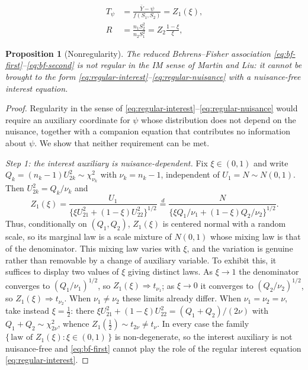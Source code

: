 \documentclass[10pt,a4paper]{amsart}
\newtheorem{proposition}{Proposition}
\begin{document}
\begin{align}
T_\psi
&=
\frac{\bar Y-\psi}{f(S_1,S_2)}
=
Z_1(\xi), \label{eq:bf-first}\\
R
&=
\frac{n_1S_2^2}{n_2S_1^2}
=
Z_2\frac{1-\xi}{\xi}, \label{eq:bf-second}
\end{align}

\begin{proposition}[Nonregularity]
\label{prop:nonregular}
The reduced Behrens--Fisher association \eqref{eq:bf-first}--\eqref{eq:bf-second}
is not regular in the IM sense of Martin and Liu: it cannot be brought to the
form \eqref{eq:regular-interest}--\eqref{eq:regular-nuisance} with a
nuisance-free interest equation.
\end{proposition}

\begin{proof}
Regularity in the sense of
\eqref{eq:regular-interest}--\eqref{eq:regular-nuisance} would require an
auxiliary coordinate for \(\psi\) whose distribution does not depend on the
nuisance, together with a companion equation that contributes no information
about \(\psi\).  We show that neither requirement can be met.

\emph{Step 1: the interest auxiliary is nuisance-dependent.}
Fix \(\xi\in(0,1)\) and write \(Q_k=(n_k-1)U_{2k}^2\sim\chi^2_{\nu_k}\) with
\(\nu_k=n_k-1\), independent of \(U_1=N\sim N(0,1)\).  Then \(U_{2k}^2=Q_k/\nu_k\)
and
\[
Z_1(\xi)
=
\frac{U_1}{\{\xi U_{21}^2+(1-\xi)U_{22}^2\}^{1/2}}
\overset{d}{=}
\frac{N}{\{\xi Q_1/\nu_1+(1-\xi)Q_2/\nu_2\}^{1/2}} .
\]
Thus, conditionally on \((Q_1,Q_2)\), \(Z_1(\xi)\) is centered normal with a
random scale, so its marginal law is a scale mixture of \(N(0,1)\) whose mixing
law is that of the denominator.  This mixing law varies with \(\xi\), and the
variation is genuine rather than removable by a change of auxiliary variable.
To exhibit this, it suffices to display two values of \(\xi\) giving distinct
laws.  As \(\xi\to1\) the denominator converges to \((Q_1/\nu_1)^{1/2}\), so
\(Z_1(\xi)\Rightarrow t_{\nu_1}\); as \(\xi\to0\) it converges to
\((Q_2/\nu_2)^{1/2}\), so \(Z_1(\xi)\Rightarrow t_{\nu_2}\).  When
\(\nu_1\neq\nu_2\) these limits already differ.  When \(\nu_1=\nu_2=\nu\), take
instead \(\xi=\tfrac12\): there \(\xi U_{21}^2+(1-\xi)U_{22}^2=(Q_1+Q_2)/(2\nu)\)
with \(Q_1+Q_2\sim\chi^2_{2\nu}\), whence \(Z_1(\tfrac12)\sim t_{2\nu}\neq
t_{\nu}\).  In every case the family \(\{\,\text{law of }Z_1(\xi):\xi\in(0,1)\,\}\)
is non-degenerate, so the interest auxiliary is not nuisance-free and
\eqref{eq:bf-first} cannot play the role of the regular interest equation
\eqref{eq:regular-interest}.


\end{proof}
\end{document}
